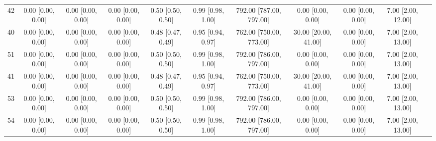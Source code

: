 \documentclass[8pt]{article}
\begin{document}
\begin{center}
\begin{footnotesize}
\begin{longtable}{|ccccccccccc|}
 42 &  0.00 [0.00, 0.00] &  0.00 [0.00, 0.00] &  0.00 [0.00, 0.00] &  0.50 [0.50, 0.50] &  0.99 [0.98, 1.00] &  792.00 [787.00, 797.00] &     0.00 [0.00, 0.00] &  0.00 [0.00, 0.00] &  7.00 [2.00, 12.00] \\
 40 &  0.00 [0.00, 0.00] &  0.00 [0.00, 0.00] &  0.00 [0.00, 0.00] &  0.48 [0.47, 0.49] &  0.95 [0.94, 0.97] &  762.00 [750.00, 773.00] &  30.00 [20.00, 41.00] &  0.00 [0.00, 0.00] &  7.00 [2.00, 13.00] \\
 51 &  0.00 [0.00, 0.00] &  0.00 [0.00, 0.00] &  0.00 [0.00, 0.00] &  0.50 [0.50, 0.50] &  0.99 [0.98, 1.00] &  792.00 [786.00, 797.00] &     0.00 [0.00, 0.00] &  0.00 [0.00, 0.00] &  7.00 [2.00, 13.00] \\
 41 &  0.00 [0.00, 0.00] &  0.00 [0.00, 0.00] &  0.00 [0.00, 0.00] &  0.48 [0.47, 0.49] &  0.95 [0.94, 0.97] &  762.00 [750.00, 773.00] &  30.00 [20.00, 41.00] &  0.00 [0.00, 0.00] &  7.00 [2.00, 13.00] \\
 53 &  0.00 [0.00, 0.00] &  0.00 [0.00, 0.00] &  0.00 [0.00, 0.00] &  0.50 [0.50, 0.50] &  0.99 [0.98, 1.00] &  792.00 [786.00, 797.00] &     0.00 [0.00, 0.00] &  0.00 [0.00, 0.00] &  7.00 [2.00, 13.00] \\
 54 &  0.00 [0.00, 0.00] &  0.00 [0.00, 0.00] &  0.00 [0.00, 0.00] &  0.50 [0.50, 0.50] &  0.99 [0.98, 1.00] &  792.00 [786.00, 797.00] &     0.00 [0.00, 0.00] &  0.00 [0.00, 0.00] &  7.00 [2.00, 13.00] \\
\end{longtable}
\end{footnotesize}
\end{center}
\end{document}
